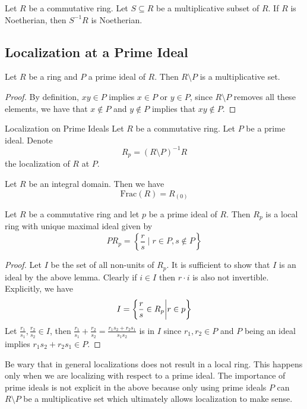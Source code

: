 \documentclass[a4paper]{article}
\begin{document}
\begin{lmm}{}{} Let $R$ be a commutative ring. Let $S\subseteq R$ be a multiplicative subset of $R$. If $R$ is Noetherian, then $S^{-1}R$ is Noetherian. 
\end{lmm}

\subsection{Localization at a Prime Ideal}
\begin{lmm}{}{} Let $R$ be a ring and $P$ a prime ideal of $R$. Then $R\setminus P$ is a multiplicative set. \tcbline
\begin{proof}
By definition, $xy\in P$ implies $x\in P$ or $y\in P$, since $R\setminus P$ removes all these elements, we have that $x\notin P$ and $y\notin P$ implies that $xy\notin P$. 
\end{proof}
\end{lmm}

\begin{defn}{Localization on Prime Ideals}{} Let $R$ be a commutative ring. Let $P$ be a prime ideal. Denote $$R_p=(R\setminus P)^{-1}R$$ the localization of $R$ at $P$. 
\end{defn}

\begin{lmm}{}{} Let $R$ be an integral domain. Then we have $$\text{Frac}(R)=R_{(0)}$$
\end{lmm}

\begin{prp}{}{} Let $R$ be a commutative ring and let $p$ be a prime ideal of $R$. Then $R_p$ is a local ring with unique maximal ideal given by $$PR_p=\left\{\frac{r}{s}\;|\;r\in P,s\notin P\right\}$$ \tcbline
\begin{proof}
Let $I$ be the set of all non-units of $R_p$. It is sufficient to show that $I$ is an ideal by the above lemma. Clearly if $i\in I$ then $r\cdot i$ is also not invertible. Explicitly, we have $$I=\left\{\frac{r}{s}\in R_p\bigg{|}r\in p\right\}$$ Let $\frac{r_1}{s_1},\frac{r_2}{s_2}\in I$, then $\frac{r_1}{s_1}+\frac{r_2}{s_2}=\frac{r_1s_2+r_2s_1}{s_1s_2}$ is in $I$ since $r_1,r_2\in P$ and $P$ being an ideal implies $r_1s_2+r_2s_1\in P$. 
\end{proof}
\end{prp}

Be wary that in general localizations does not result in a local ring. This happens only when we are localizing with respect to a prime ideal. The importance of prime ideals is not explicit in the above because only using prime ideals $P$ can $R\setminus P$ be a multiplicative set which ultimately allows localization to make sense. 
\end{document}
